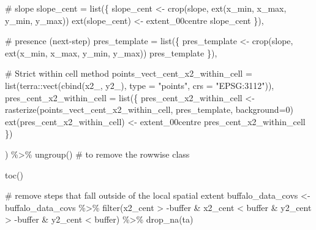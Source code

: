 \documentclass[
  letterpaper,
  DIV=11,
  numbers=noendperiod]{scrartcl}
\newenvironment{Shaded}{\begin{snugshade}}{\end{snugshade}}
\newcommand{\AttributeTok}[1]{\textcolor[rgb]{0.40,0.45,0.13}{#1}}
\newcommand{\CommentTok}[1]{\textcolor[rgb]{0.37,0.37,0.37}{#1}}
\newcommand{\DecValTok}[1]{\textcolor[rgb]{0.68,0.00,0.00}{#1}}
\newcommand{\FunctionTok}[1]{\textcolor[rgb]{0.28,0.35,0.67}{#1}}
\newcommand{\NormalTok}[1]{\textcolor[rgb]{0.00,0.23,0.31}{#1}}
\newcommand{\OtherTok}[1]{\textcolor[rgb]{0.00,0.23,0.31}{#1}}
\newcommand{\SpecialCharTok}[1]{\textcolor[rgb]{0.37,0.37,0.37}{#1}}
\newcommand{\StringTok}[1]{\textcolor[rgb]{0.13,0.47,0.30}{#1}}
\begin{document}
\begin{Shaded}
\begin{Highlighting}[]
    \CommentTok{\# slope}
    \AttributeTok{slope\_cent =} \FunctionTok{list}\NormalTok{(\{}
\NormalTok{      slope\_cent }\OtherTok{\textless{}{-}} \FunctionTok{crop}\NormalTok{(slope, }\FunctionTok{ext}\NormalTok{(x\_min, x\_max, y\_min, y\_max))}
      \FunctionTok{ext}\NormalTok{(slope\_cent) }\OtherTok{\textless{}{-}}\NormalTok{ extent\_00centre}
\NormalTok{      slope\_cent}
\NormalTok{      \}),}
    
    \CommentTok{\# presence (next{-}step)}
    \AttributeTok{pres\_template =} \FunctionTok{list}\NormalTok{(\{}
\NormalTok{      pres\_template }\OtherTok{\textless{}{-}} \FunctionTok{crop}\NormalTok{(slope, }\FunctionTok{ext}\NormalTok{(x\_min, x\_max, y\_min, y\_max))}
\NormalTok{      pres\_template}
\NormalTok{    \}),}
    
    \CommentTok{\# Strict within cell method}
    \AttributeTok{points\_vect\_cent\_x2\_within\_cell =} \FunctionTok{list}\NormalTok{(terra}\SpecialCharTok{::}\FunctionTok{vect}\NormalTok{(}\FunctionTok{cbind}\NormalTok{(x2\_, y2\_), }\AttributeTok{type =} \StringTok{"points"}\NormalTok{, }\AttributeTok{crs =} \StringTok{"EPSG:3112"}\NormalTok{)),}
    \AttributeTok{pres\_cent\_x2\_within\_cell =} \FunctionTok{list}\NormalTok{(\{}
\NormalTok{      pres\_cent\_x2\_within\_cell }\OtherTok{\textless{}{-}} \FunctionTok{rasterize}\NormalTok{(points\_vect\_cent\_x2\_within\_cell, pres\_template, }\AttributeTok{background=}\DecValTok{0}\NormalTok{)}
      \FunctionTok{ext}\NormalTok{(pres\_cent\_x2\_within\_cell) }\OtherTok{\textless{}{-}}\NormalTok{ extent\_00centre}
\NormalTok{      pres\_cent\_x2\_within\_cell}
\NormalTok{      \})}
    
\NormalTok{  ) }\SpecialCharTok{\%\textgreater{}\%} \FunctionTok{ungroup}\NormalTok{() }\CommentTok{\# to remove the \textquotesingle{}rowwise\textquotesingle{} class}


  \FunctionTok{toc}\NormalTok{()}

  \CommentTok{\# remove steps that fall outside of the local spatial extent}
\NormalTok{  buffalo\_data\_covs }\OtherTok{\textless{}{-}}\NormalTok{ buffalo\_data\_covs }\SpecialCharTok{\%\textgreater{}\%}
    \FunctionTok{filter}\NormalTok{(x2\_cent }\SpecialCharTok{\textgreater{}} \SpecialCharTok{{-}}\NormalTok{buffer }\SpecialCharTok{\&}\NormalTok{ x2\_cent }\SpecialCharTok{\textless{}}\NormalTok{ buffer }\SpecialCharTok{\&}\NormalTok{ y2\_cent }\SpecialCharTok{\textgreater{}} \SpecialCharTok{{-}}\NormalTok{buffer }\SpecialCharTok{\&}\NormalTok{ y2\_cent }\SpecialCharTok{\textless{}}\NormalTok{ buffer) }\SpecialCharTok{\%\textgreater{}\%}
    \FunctionTok{drop\_na}\NormalTok{(ta)}


\end{Highlighting}
\end{Shaded}
\end{document}
